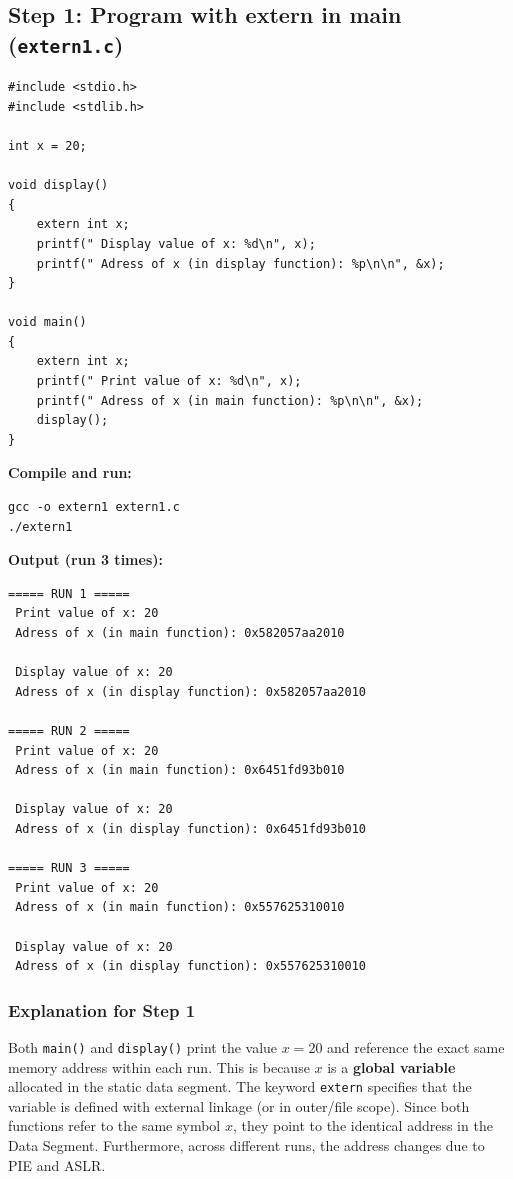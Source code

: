 \documentclass[12pt,a4paper]{article}
\begin{document}
\subsection{Step 1: Program with extern in main (\texttt{extern1.c})}

\begin{lstlisting}[style=cstyle]
#include <stdio.h>
#include <stdlib.h>

int x = 20;

void display()
{
    extern int x;
    printf(" Display value of x: %d\n", x);
    printf(" Adress of x (in display function): %p\n\n", &x);
}

void main()
{
    extern int x;
    printf(" Print value of x: %d\n", x);
    printf(" Adress of x (in main function): %p\n\n", &x);
    display();
}
\end{lstlisting}

\textbf{Compile and run:}
\begin{lstlisting}[style=bashstyle]
gcc -o extern1 extern1.c
./extern1
\end{lstlisting}

\textbf{Output (run 3 times):}
\begin{lstlisting}[style=outstyle]
===== RUN 1 =====
 Print value of x: 20
 Adress of x (in main function): 0x582057aa2010

 Display value of x: 20
 Adress of x (in display function): 0x582057aa2010

===== RUN 2 =====
 Print value of x: 20
 Adress of x (in main function): 0x6451fd93b010

 Display value of x: 20
 Adress of x (in display function): 0x6451fd93b010

===== RUN 3 =====
 Print value of x: 20
 Adress of x (in main function): 0x557625310010

 Display value of x: 20
 Adress of x (in display function): 0x557625310010
\end{lstlisting}

\subsubsection*{Explanation for Step 1}
Both \texttt{main()} and \texttt{display()} print the value $x = 20$ and reference the exact same memory address within each run. This is because $x$ is a \textbf{global variable} allocated in the static data segment. The keyword \texttt{extern} specifies that the variable is defined with external linkage (or in outer/file scope). Since both functions refer to the same symbol $x$, they point to the identical address in the Data Segment. Furthermore, across different runs, the address changes due to PIE and ASLR.
\end{document}
